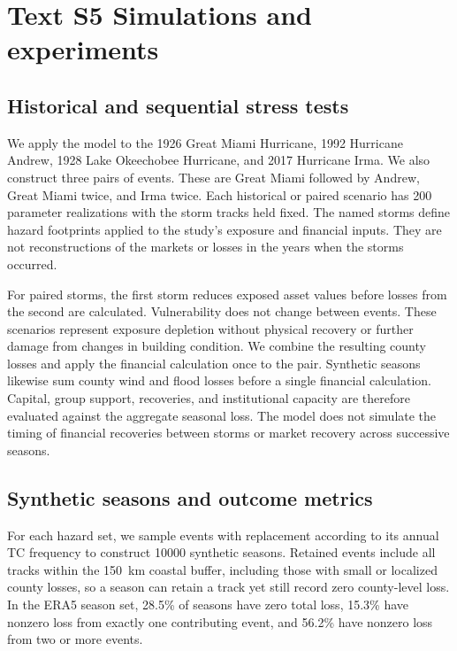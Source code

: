 \section*{Text S5 Simulations and experiments}\label{TextS5}
\subsection*{Historical and sequential stress tests}
We apply the model to the 1926 Great Miami Hurricane, 1992 Hurricane Andrew, 1928 Lake Okeechobee Hurricane, and 2017 Hurricane Irma. We also construct three pairs of events. These are Great Miami followed by Andrew, Great Miami twice, and Irma twice. Each historical or paired scenario has 200 parameter realizations with the storm tracks held fixed. The named storms define hazard footprints applied to the study's exposure and financial inputs. They are not reconstructions of the markets or losses in the years when the storms occurred.

For paired storms, the first storm reduces exposed asset values before losses from the second are calculated. Vulnerability does not change between events. These scenarios represent exposure depletion without physical recovery or further damage from changes in building condition. We combine the resulting county losses and apply the financial calculation once to the pair. Synthetic seasons likewise sum county wind and flood losses before a single financial calculation. Capital, group support, recoveries, and institutional capacity are therefore evaluated against the aggregate seasonal loss. The model does not simulate the timing of financial recoveries between storms or market recovery across successive seasons.

\subsection*{Synthetic seasons and outcome metrics}\label{MethodsOutput}
For each hazard set, we sample events with replacement according to its annual TC frequency to construct \num{10000} synthetic seasons. Retained events include all tracks within the \SI{150}{\kilo\meter} coastal buffer, including those with small or localized county losses, so a season can retain a track yet still record zero county-level loss. In the ERA5 season set, 28.5\% of seasons have zero total loss, 15.3\% have nonzero loss from exactly one contributing event, and 56.2\% have nonzero loss from two or more events.


